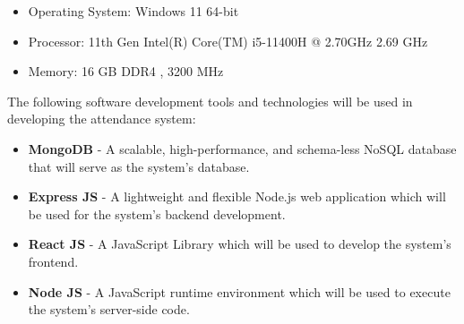 \documentclass[journal]{./IEEE/IEEEtran}
\begin{document}
\begin{itemize}
    \item Operating System: Windows 11 64-bit
    \item Processor: 11th Gen Intel(R) Core(TM) i5-11400H @ 2.70GHz   2.69 GHz
    \item Memory: 16 GB DDR4 , 3200 MHz
    \newline
\end{itemize}
\newline
The following software development tools and technologies will be used in developing the attendance system:
\begin{itemize}
    \item \textbf{MongoDB} - A scalable, high-performance, and schema-less NoSQL database that will serve as the system’s database.
    \item \textbf{Express JS} - A lightweight and flexible Node.js web application which will be used for the system’s backend development.
    \item \textbf{React JS} - A JavaScript Library which will be used to develop the system’s frontend.
    \item \textbf{Node JS} - A JavaScript runtime environment which will be used to execute the system’s server-side code.
\end{itemize}
\end{document}

